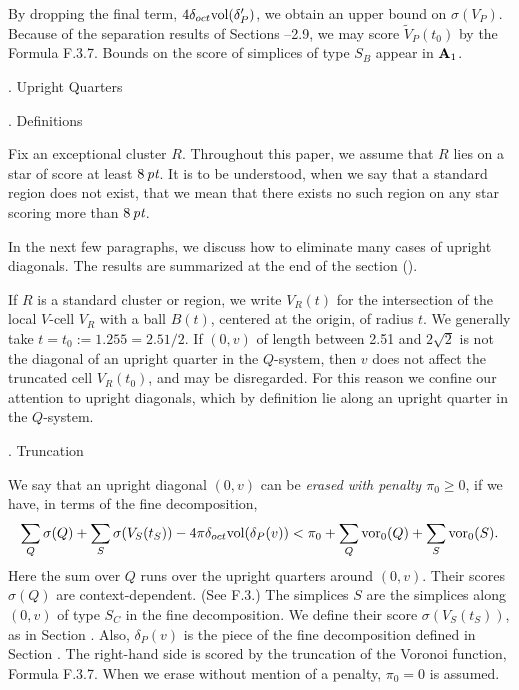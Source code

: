 By dropping the final term, $4\delta_{oct}\hbox{vol}(\delta'_P)$, we obtain an
upper bound on $\sigma(V_P)$.  Because of the separation results
of Sections --2.9, we may score $\tilde V_P(t_0)$ by the Formula
 F.3.7. 
Bounds on the score of simplices of type $S_B$ appear in
${\bold A}_1$.



\heads{}
\vfill\eject
\head {}.  Upright Quarters\endhead

\subhead {}. Definitions\endsubhead

Fix an exceptional cluster $R$.  
Throughout this paper, we assume that $R$ lies on
a star of score at
least $8\,\hbox{\it pt}$. 
It is to be understood, when we
say that a standard region does not exist, that we mean that
there exists no such region on any star scoring more
than $8\,\hbox{\it pt}$.


In the next few paragraphs, we discuss
how to eliminate many cases of upright diagonals.  
The results are summarized at the
end of the section ().

If $R$ is a standard cluster or region,
we write $V_R(t)$
for the intersection of the local $V$-cell $V_R$ with a ball 
$B(t)$, centered at the origin, of radius $t$.  We generally
take $t=t_0:=1.255=2.51/2$.
If $(0,v)$ of length between 2.51 and $2\sqrt{2}$ is not the
diagonal of an upright quarter in the $Q$-system, 
then $v$ does not affect
the truncated cell $V_R(t_0)$,
and may be disregarded.  For this reason we confine our attention
to upright diagonals, which by definition lie along an upright
quarter in the $Q$-system.

\subhead {}. Truncation\endsubhead

We say that an upright diagonal $(0,v)$
can be {\it erased with penalty $\pi_0\ge0$}, if we have, in terms of the
fine decomposition,
$$\sum_Q\sigma(Q) +\sum_S\sigma(V_S(t_S)) - 4\pi\delta_{oct}\hbox{vol}(\delta_P(v))<
	\pi_0+\sum_Q\operatorname{vor}_0(Q) +\sum_S\operatorname{vor}_0(S).$$
Here the sum over $Q$ runs over the upright quarters around $(0,v)$.
Their scores $\sigma(Q)$ are context-dependent. (See  F.3.) 
The simplices $S$ are the simplices along $(0,v)$ of type $S_C$ in the
fine decomposition.  We define their score $\sigma(V_S(t_S))$,
as in Section .  Also, $\delta_P(v)$ is the piece
of the fine decomposition
defined in Section .   The right-hand side is scored by
the truncation of the Voronoi function, Formula  F.3.7.
When we erase without mention of a penalty, $\pi_0=0$ is assumed.

